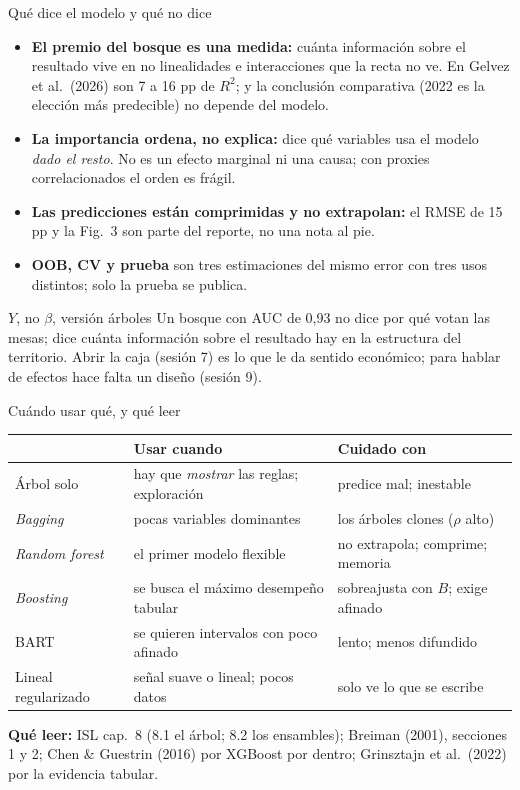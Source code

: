 \documentclass{beamer}
\newcommand{\1}{\mathbb{I}}
\begin{document}
\begin{frame}{Qué dice el modelo y qué no dice}
\small
\begin{itemize}\itemsep3pt
  \item \textbf{El premio del bosque es una medida:} cuánta información sobre el resultado vive en no linealidades e interacciones que la recta no ve. En Gelvez et al.\ (2026) son 7 a 16 pp de $R^2$; y la conclusión comparativa (2022 es la elección más predecible) no depende del modelo. \pause
  \item \textbf{La importancia ordena, no explica:} dice qué variables usa el modelo \emph{dado el resto}. No es un efecto marginal ni una causa; con proxies correlacionados el orden es frágil. \pause
  \item \textbf{Las predicciones están comprimidas y no extrapolan:} el RMSE de 15 pp y la Fig.\ 3 son parte del reporte, no una nota al pie. \pause
  \item \textbf{OOB, CV y prueba} son tres estimaciones del mismo error con tres usos distintos; solo la prueba se publica.
\end{itemize}
\pause
\begin{block}{$Y$, no $\beta$, versión árboles}
Un bosque con AUC de 0,93 no dice por qué votan las mesas; dice cuánta información sobre el resultado hay en la estructura del territorio. Abrir la caja (sesión 7) es lo que le da sentido económico; para hablar de efectos hace falta un diseño (sesión 9).
\end{block}
\end{frame}

\begin{frame}{Cuándo usar qué, y qué leer}
\small
\begin{center}
\scriptsize
\setlength{\tabcolsep}{4pt}
\renewcommand{\arraystretch}{1.1}
\begin{tabular}{lp{4.4cm}p{4.3cm}}
\hline
 & Usar cuando & Cuidado con \\
\hline
Árbol solo & hay que \emph{mostrar} las reglas; exploración & predice mal; inestable \\
\emph{Bagging} & pocas variables dominantes & los árboles clones ($\rho$ alto) \\
\emph{Random forest} & el primer modelo flexible & no extrapola; comprime; memoria \\
\emph{Boosting} & se busca el máximo desempeño tabular & sobreajusta con $B$; exige afinado \\
BART & se quieren intervalos con poco afinado & lento; menos difundido \\
Lineal regularizado & señal suave o lineal; pocos datos & solo ve lo que se escribe \\
\hline
\end{tabular}
\end{center}
\pause
\textbf{Qué leer:} ISL cap.\ 8 (8.1 el árbol; 8.2 los ensambles); Breiman (2001), secciones 1 y 2; Chen \& Guestrin (2016) por XGBoost por dentro; Grinsztajn et al.\ (2022) por la evidencia tabular.
\end{frame}
\end{document}
